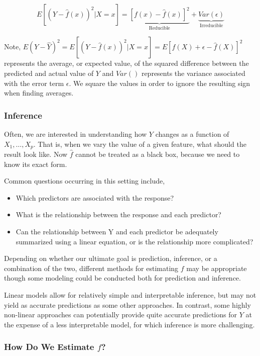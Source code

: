 \documentclass{article}
\begin{document}
\[
    E[(Y - \hat f (x))^2 | X = x] = \underbrace{[f(x) - \hat f(x)]^2}_{\text{Reducible}} + \underbrace{Var(\epsilon)}_{\text{Irreducible}} 
\]

Note, $E(Y - \hat Y)^2 = E[(Y - \hat f (x))^2 | X = x] = E[f(X) + \epsilon - \hat f(X)]^2$ represents the average, or expected value, of the squared difference between the predicted and actual value of $Y$ and $Var()$ represents the variance associated with the error term  $\epsilon$. We square the values in order to ignore the resulting sign when finding averages.


\subsubsection*{Inference}
Often, we are interested in understanding how $Y$ changes as a function of $X_1,\dots,X_p$. That is, when we vary the value of a given feature, what should the result look like. Now $\hat f$ cannot be treated as a black box, because we need to know its exact form.

Common questions occurring in this setting include,
\begin{itemize}
    \item Which predictors are associated with the response?
    \item What is the relationship between the response and each predictor?
    \item Can the relationship between Y and each predictor be adequately summarized using a linear equation, or is the relationship more complicated? 
\end{itemize}

Depending on whether our ultimate goal is prediction, inference, or a combination of the two, different methods for estimating $f$ may be appropriate though some modeling could be conducted both for prediction and inference.

Linear models allow for relatively simple and interpretable inference, but may not yield as accurate predictions as some other
approaches. In contrast, some highly non-linear approaches can potentially provide quite accurate predictions for $Y$ at the expense of a less interpretable model, for which inference is more challenging.

\subsubsection{How Do We Estimate \texorpdfstring{$f$}{f}?}
\end{document}
